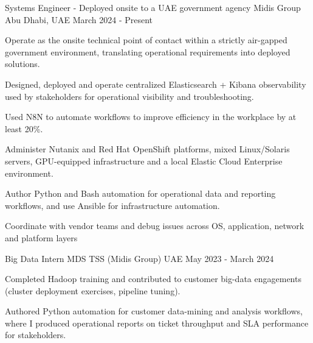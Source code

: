 

\begin{cventries}
	
	\cventry
	{Systems Engineer - Deployed onsite to a UAE government agency} %
	{Midis Group} %
	{Abu Dhabi, UAE} %
	{March 2024 - Present} %
	{
		\begin{cvitems}
			\item Operate as the onsite technical point of contact within a strictly air-gapped government environment, translating operational requirements into deployed solutions.
			\item {Designed, deployed and operate centralized Elasticsearch + Kibana observability used by stakeholders for operational visibility and troubleshooting.}
			\item Used N8N to automate workflows to improve efficiency in the workplace by at least 20\%.
            \item {Administer Nutanix and Red Hat OpenShift platforms, mixed Linux/Solaris servers, GPU-equipped infrastructure and a local Elastic Cloud Enterprise environment.}
			\item Author Python and Bash automation for operational data and reporting workflows, and use Ansible for infrastructure automation.
			\item Coordinate with vendor teams and debug issues across OS, application, network and platform layers
		\end{cvitems}
	}
	
	\cventry
	{Big Data Intern} %
	{MDS TSS (Midis Group)} %
	{UAE} %
	{May 2023 - March 2024} %
	{
		\begin{cvitems}
			\item Completed Hadoop training and contributed to customer big-data engagements (cluster deployment exercises, pipeline tuning).
			\item Authored Python automation for customer data-mining and analysis workflows, where I produced operational reports on ticket throughput and SLA performance for stakeholders.
		\end{cvitems}
	}
	

\end{cventries}
